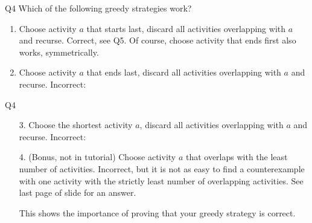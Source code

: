 \documentclass[t]{beamer}
\begin{document}
\begin{frame}{Q4}
  Which of the following greedy strategies work?
  \begin{enumerate}
    \item Choose activity $a$ that starts last, discard all activities overlapping with $a$ and recurse. Correct, see Q5. Of course, choose activity that ends first also works, symmetrically. 
    \item Choose activity $a$ that ends last, discard all activities overlapping with $a$ and recurse. Incorrect: 
    \vspace{0.5cm}
    \begin{center}
    \end{center}
  \end{enumerate}
\end{frame}
\begin{frame}{Q4}
  \begin{enumerate}
    \item [3.] Choose the shortest activity $a$, discard all activities overlapping with $a$ and recurse. Incorrect: 
    \vspace{0.5cm}
    \begin{center}
    \end{center}
    \vspace{0.5cm}
    \item [4.] (Bonus, not in tutorial) Choose activity $a$ that overlaps with the least number of activities. Incorrect, but it is not as easy to find a counterexample with one activity with the strictly least number of overlapping activities. See last page of slide for an answer. 
    \par This shows the importance of proving that your greedy strategy is correct. 
  \end{enumerate}
  
\end{frame}
\end{document}
